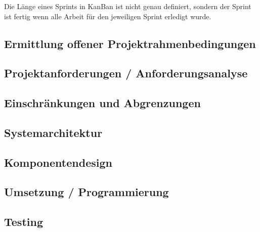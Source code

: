 Die Länge eines Sprints in KanBan ist nicht genau definiert, sondern der Sprint ist fertig wenn alle Arbeit für den jeweiligen Sprint erledigt wurde.

\subsection{Ermittlung offener Projektrahmenbedingungen}
\label{ch:evaluation}


\subsection{Projektanforderungen / Anforderungsanalyse}
\label{sub:Anforderungen}

\subsection{Einschränkungen und Abgrenzungen}


\subsection{Systemarchitektur}

\subsection{Komponentendesign}

\subsection{Umsetzung / Programmierung}

\subsection{Testing}
